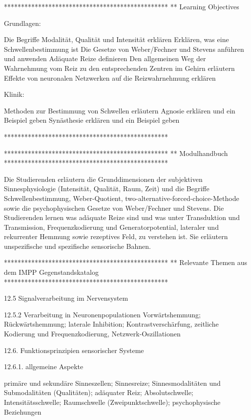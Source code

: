 ************************************************
** Learning Objectives 


Grundlagen: 

Die Begriffe Modalität, Qualität und Intensität erklären
Erklären, was eine Schwellenbestimmung ist 
Die Gesetze von Weber/Fechner und Stevens anführen und anwenden
Adäquate Reize definieren
Den allgemeinen Weg der Wahrnehmung vom Reiz zu den entsprechenden Zentren im Gehirn erläutern 
Effekte von neuronalen Netzwerken auf die Reizwahrnehmung erklären

Klinik:

Methoden zur Bestimmung von Schwellen erläutern 
Agnosie erklären und ein Beispiel geben
Synästhesie erklären und ein Beispiel geben


************************************************



************************************************
** Modulhandbuch
************************************************

Die  Studierenden  erläutern  die  Grunddimensionen  der  subjektiven Sinnesphysiologie  (Intensität,  Qualität,  Raum,  Zeit)  und  die  Begriffe Schwellenbestimmung, Weber-Quotient, two-alternative-forced-choice-Methode   sowie   die   psychophysischen   Gesetze   von   Weber/Fechner  und  Stevens.  Die  Studierenden  lernen  was  adäquate Reize sind und was unter Transduktion und Transmission, Frequenzkodierung und Generatorpotential, lateraler und rekurrenter Hemmung sowie  rezeptives  Feld,  zu  verstehen  ist.  Sie  erläutern  unspezifische und spezifische sensorische Bahnen.


************************************************
** Relevante Themen aus dem IMPP Gegenstandskatalog
************************************************

12.5 Signalverarbeitung im Nervensystem

    12.5.2 Verarbeitung in Neuronenpopulationen
        Vorwärtshemmung; Rückwärtshemmung; laterale Inhibition; Kontrastverschärfung, zeitliche Kodierung und Frequenzkodierung, Netzwerk-Oszillationen

12.6. Funktionsprinzipien sensorischer Systeme

    12.6.1. allgemeine Aspekte
        
        primäre und sekundäre Sinneszellen; Sinnesreize; Sinnesmodalitäten und Submodalitäten (Qualitäten); adäquater Reiz; Absolutschwelle; Intensitätsschwelle; Raumschwelle (Zweipunktschwelle); psychophysische Beziehungen
        
